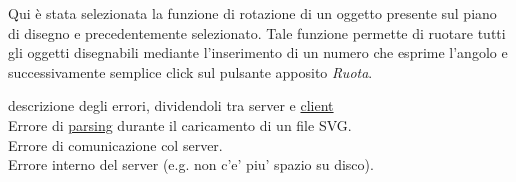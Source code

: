 

\vspace{100pt}
Qui \`e stata selezionata la funzione di rotazione di un oggetto presente sul piano di disegno e precedentemente selezionato. Tale funzione permette di ruotare tutti gli oggetti disegnabili mediante l'inserimento di un numero che esprime l'angolo e successivamente semplice click sul pulsante apposito \textit{Ruota}. \\


descrizione degli errori, dividendoli tra server e \underline{client}\\
Errore di \underline{parsing} durante il caricamento di un file SVG.\\
Errore di comunicazione col server. \\
Errore interno del server (e.g. non c'e' piu' spazio su disco).\\


